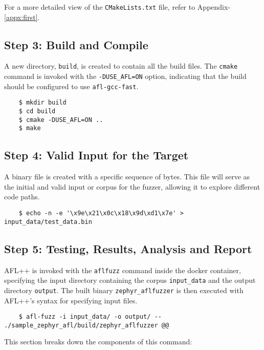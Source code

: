 For a more detailed view of the \texttt{CMakeLists.txt} file, refer to
Appendix-\ref{appx:first}.

\subsection*{Step 3: Build and Compile}
A new directory, \texttt{build}, is created to contain all the build files.
The \texttt{cmake} command is invoked with the \texttt{-DUSE\_AFL=ON} option,
indicating that the build should be configured to
use \texttt{afl-gcc-fast}\cite{AFLplusp13:online}.

\begin{verbatim}
    $ mkdir build
    $ cd build
    $ cmake -DUSE_AFL=ON ..
    $ make
\end{verbatim}

\subsection*{Step 4: Valid Input for the Target}
A binary file is created with a specific sequence of bytes.
This file will serve as the initial and valid input or corpus for the fuzzer,
allowing it to explore different code paths.

\begin{verbatim}
    $ echo -n -e '\x9e\x21\x0c\x18\x9d\xd1\x7e' > input_data/test_data.bin
\end{verbatim}

\subsection*{Step 5: Testing, Results, Analysis and Report}
AFL++ is invoked with the \texttt{afl\-fuzz} command inside the docker container,
specifying the input directory containing the corpus \texttt{input\_data} and
the output directory \texttt{output}. The built binary \texttt{zephyr\_aflfuzzer}
is then executed with AFL++'s syntax for specifying input files.

\begin{verbatim}
    $ afl-fuzz -i input_data/ -o output/ -- ./sample_zephyr_afl/build/zephyr_aflfuzzer @@
\end{verbatim}

This section breaks down the components of this command\cite{257204}:

